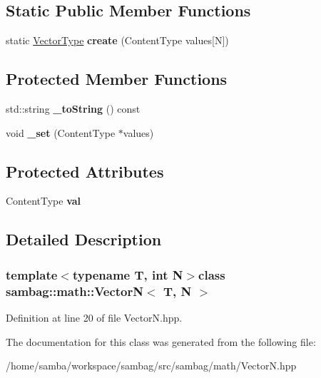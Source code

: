 \subsection*{Static Public Member Functions}
\begin{DoxyCompactItemize}
\item 
\hypertarget{classsambag_1_1math_1_1_vector_n_a9c6bc2fd69015a1dfc33b07d83d3998e}{
static \hyperlink{classsambag_1_1math_1_1_vector_n}{VectorType} {\bfseries create} (ContentType values\mbox{[}N\mbox{]})}
\label{classsambag_1_1math_1_1_vector_n_a9c6bc2fd69015a1dfc33b07d83d3998e}

\end{DoxyCompactItemize}
\subsection*{Protected Member Functions}
\begin{DoxyCompactItemize}
\item 
\hypertarget{classsambag_1_1math_1_1_vector_n_a941267fdf1daea1cee546d127a2c2078}{
std::string {\bfseries \_\-toString} () const }
\label{classsambag_1_1math_1_1_vector_n_a941267fdf1daea1cee546d127a2c2078}

\item 
\hypertarget{classsambag_1_1math_1_1_vector_n_a55a92eeac5cdda7612bffed97ac6d9c1}{
void {\bfseries \_\-set} (ContentType $\ast$values)}
\label{classsambag_1_1math_1_1_vector_n_a55a92eeac5cdda7612bffed97ac6d9c1}

\end{DoxyCompactItemize}
\subsection*{Protected Attributes}
\begin{DoxyCompactItemize}
\item 
\hypertarget{classsambag_1_1math_1_1_vector_n_af5c2c75d8daa95e93d28692bc841d23c}{
ContentType {\bfseries val}}
\label{classsambag_1_1math_1_1_vector_n_af5c2c75d8daa95e93d28692bc841d23c}

\end{DoxyCompactItemize}


\subsection{Detailed Description}
\subsubsection*{template$<$typename T, int N$>$class sambag::math::VectorN$<$ T, N $>$}



Definition at line 20 of file VectorN.hpp.



The documentation for this class was generated from the following file:\begin{DoxyCompactItemize}
\item 
/home/samba/workspace/sambag/src/sambag/math/VectorN.hpp\end{DoxyCompactItemize}
